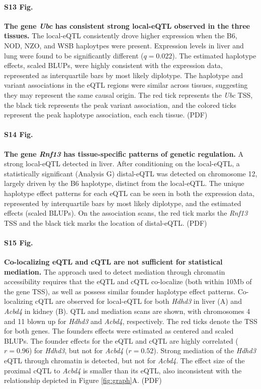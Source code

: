 \documentclass[10pt,letterpaper]{article}
\begin{document}
\paragraph*{S13 Fig.}
\label{S_ubc_correlated_eqtl}
{\bf The gene \textit{Ubc} has consistent strong local-eQTL observed in the three tissues.}
The local-eQTL consistently drove higher expression when the B6, NOD, NZO, and WSB haploytpes were present. Expression levels in liver and lung were found to be significantly different ($q = 0.022$). The estimated haplotype effects, scaled BLUPs, were highly consistent with the expression data, represented as interquartile bars by most likely diplotype. The haplotype and variant associations in the eQTL regions were similar across tissues, suggesting they may represent the same causal origin. The red tick represents the \textit{Ubc} TSS, the black tick represents the peak variant association, and the colored ticks represent the peak haplotype association, each each tissue. (PDF)

\paragraph*{S14 Fig.}
\label{S_rnf13_distal_eqtl}
{\bf The gene \textit{Rnf13} has tissue-specific patterns of genetic regulation.}
A strong local-eQTL detected in liver. After conditioning on the local-eQTL, a statistically significant (Analysis G) distal-eQTL was detected on chromosome 12, largely driven by the B6 haplotype, distinct from the local-eQTL. The unique haplotype effect patterns for each eQTL can be seen in both the expression data, represented by interquartile bars by most likely diplotype, and the estimated effects (scaled BLUPs). On the association scans, the red tick marks the \textit{Rnf13} TSS and the black tick marks the location of distal-eQTL. (PDF)

\paragraph*{S15 Fig.}
\label{S_colocalization}
{\bf Co-localizing eQTL and cQTL are not sufficient for statistical mediation.}
The approach used to detect mediation through chromatin accessibility requires that the eQTL and cQTL co-localize (both within 10Mb of the gene TSS), as well as possess similar founder haplotype effect patterns. Co-localizing cQTL are observed for local-eQTL for both \textit{Hdhd3} in liver (A) and \textit{Acbd4} in kidney (B). QTL and mediation scans are shown, with chromosomes 4 and 11 blown up for \textit{Hdhd3} and \textit{Acbd4}, respectively. The red ticks denote the TSS for both genes. The founders effects were estimated as centered and scaled BLUPs. The founder effects for the eQTL and cQTL are highly correlated ($r = 0.96$) for \textit{Hdhd3}, but not for \textit{Acbd4} ($r = 0.52$). Strong mediation of the \textit{Hdhd3} eQTL through chromatin is detected, but not for \textit{Acbd4}. The effect size of the proximal cQTL to \textit{Acbd4} is smaller than its eQTL, also inconsistent with the relationship depicted in Figure \ref{fig:graph}A. (PDF)
\end{document}
